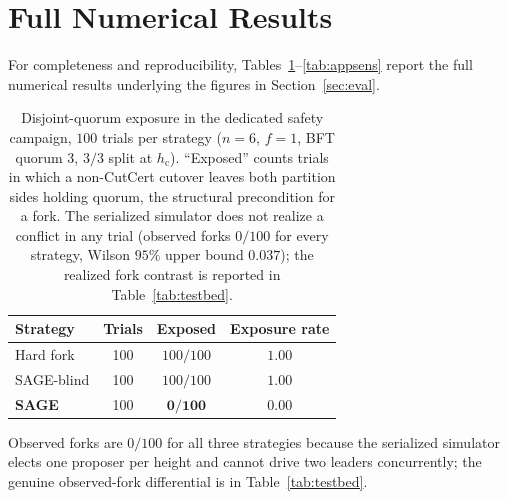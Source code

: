 \documentclass[journal]{IEEEtran}
\theoremstyle{remark}
\begin{document}
\section{Full Numerical Results}
\label{app:data}
For completeness and reproducibility, Tables~\ref{tab:appsafety}--\ref{tab:appsens} report the
full numerical results underlying the figures in Section~\ref{sec:eval}.

\begin{table}[h]
\centering
\begin{threeparttable}
\caption{Disjoint-quorum exposure in the dedicated safety campaign,
$100$ trials per strategy ($n{=}6$, $f{=}1$, BFT quorum $3$, $3/3$ split at $h_{\mathrm{c}}$).
``Exposed'' counts trials in which a non-CutCert cutover leaves both partition sides holding
quorum, the structural precondition for a fork. The serialized simulator does not realize a
conflict in any trial (observed forks $0/100$ for every strategy, Wilson $95\%$ upper bound
$0.037$); the realized fork contrast is reported in Table~\ref{tab:testbed}.}
\label{tab:appsafety}
\setlength{\tabcolsep}{6pt}\renewcommand{\arraystretch}{1.15}\footnotesize
\begin{tabular}{lccc}
\toprule
Strategy & Trials & Exposed & Exposure rate \\
\midrule
Hard fork     & 100 & $100/100$         & $1.00$ \\
SAGE-blind    & 100 & $100/100$         & $1.00$ \\
\textbf{SAGE} & 100 & $\mathbf{0/100}$  & $\mathbf{0.00}$ \\
\bottomrule
\end{tabular}
\begin{tablenotes}\footnotesize
\item Observed forks are $0/100$ for all three strategies because the serialized simulator
elects one proposer per height and cannot drive two leaders concurrently; the genuine
observed-fork differential is in Table~\ref{tab:testbed}.
\end{tablenotes}
\end{threeparttable}
\end{table}
\end{document}
